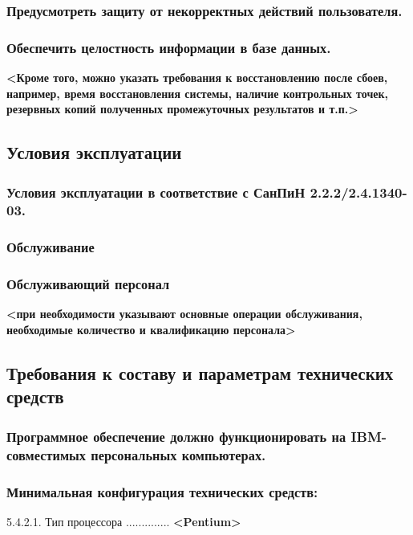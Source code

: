 \documentclass[12pt, left=30mm, right=15mm, top=20mm, bottom=20mm]{templateReportBMSTU}
\begin{document}
	\subsubsection{Предусмотреть защиту от некорректных действий пользователя.}

	\subsubsection{\textbf{Обеспечить целостность информации в базе данных.}}
	\textbf{<Кроме того, можно указать требования к восстановлению после сбоев, например, время восстановления системы, наличие контрольных точек, резервных копий полученных промежуточных результатов и т.п.> }

	\subsection{Условия эксплуатации}

	\subsubsection{Условия эксплуатации в соответствие с СанПиН 2.2.2/2.4.1340-03.}
	
	\subsubsection{\textbf{Обслуживание}}

	\subsubsection{\textbf{Обслуживающий персонал}}

	\textbf{<при необходимости указывают основные операции обслуживания, необходимые количество и квалификацию персонала>}

	\subsection{Требования к составу и параметрам технических средств}


	\subsubsection{Программное обеспечение должно функционировать на IBM-совместимых персональных компьютерах.}

	\subsubsection{Минимальная конфигурация технических средств:}
	5.4.2.1. Тип процессора .............. \textbf{<Pentium>}
	
\end{document}
